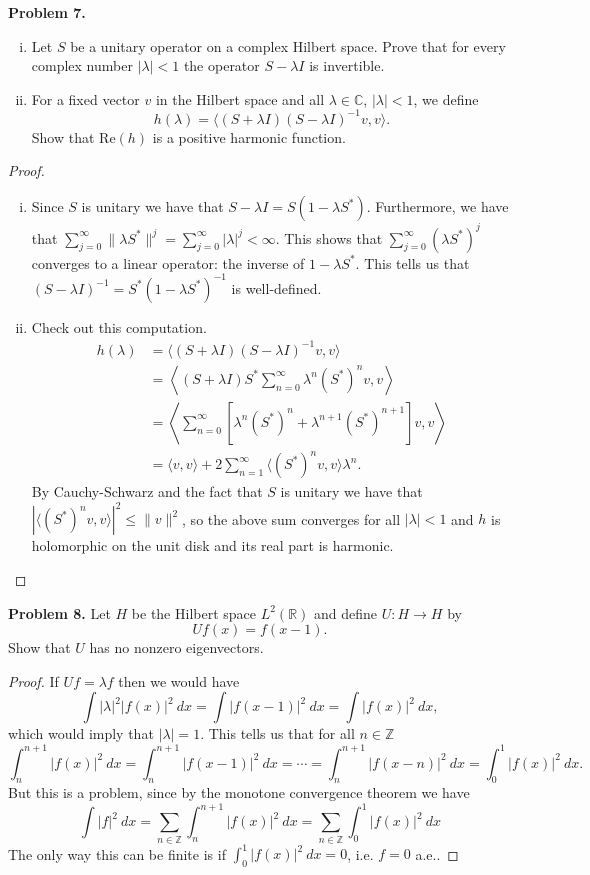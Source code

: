 \documentclass[11pt,letterpaper]{report}
\newcommand{\integers}{\mathbb{Z}}
\newcommand{\complex}{\mathbb{C}}
\newcommand{\reals}{\mathbb{R}}
\newcommand{\re}[1]{\text{Re}\left({#1}\right)}
\begin{document}
\noindent\textbf{Problem 7. }
\begin{enumerate}[(i)]
	\item Let $S$ be a unitary operator on a complex Hilbert space. Prove that for every complex number $|\lambda|<1$ the operator $S-\lambda I$ is invertible.

	\item For a fixed vector $v$ in the Hilbert space and all $\lambda \in \complex$, $|\lambda|<1$, we define
	\[
	h(\lambda) = \langle (S+\lambda I)(S-\lambda I)^{-1}v,v\rangle.
	\]
	Show that $\re h$ is a positive harmonic function.
\end{enumerate}

\begin{proof}
	\begin{enumerate}[(i)]
		\item Since $S$ is unitary we have that $S-\lambda I = S(1-\lambda S^*)$. Furthermore, we have that $\sum_{j=0}^\infty \|\lambda S^*\|^j = \sum_{j=0}^\infty |\lambda|^j<\infty$. This shows that $\sum_{j=0}^\infty (\lambda S^*)^j$ converges to a linear operator: the inverse of $1-\lambda S^*$. This tells us that $(S-\lambda I)^{-1} = S^*(1-\lambda S^*)^{-1}$ is well-defined.

		\item Check out this computation.
		\begin{align*}
			h(\lambda) &= \langle (S+\lambda I)(S-\lambda I)^{-1}v,v\rangle\\
			&= \left\langle (S+\lambda I)S^*\sum_{n=0}^\infty \lambda^n(S^*)^nv, v\right\rangle\\
			&= \left\langle\sum_{n=0}^\infty\left[\lambda^n(S^*)^n + \lambda^{n+1}(S^*)^{n+1}\right]v, v\right\rangle\\
			&= \langle v, v\rangle + 2\sum_{n=1}^\infty \langle (S^*)^nv,v\rangle\lambda^n.
		\end{align*}
		By Cauchy-Schwarz and the fact that $S$ is unitary we have that $|\langle (S^*)^nv,v\rangle|^2 \leq \|v\|^2$, so the above sum converges for all $|\lambda|<1$ and $h$ is holomorphic on the unit disk and its real part is harmonic.
	\end{enumerate}
\end{proof}

\noindent\textbf{Problem 8. }
Let $H$ be the Hilbert space $L^2(\reals)$ and define $U:H\to H$ by
\[
Uf(x) = f(x-1).
\]
Show that $U$ has no nonzero eigenvectors.
\begin{proof}
	If $Uf = \lambda f$ then we would have
	\[
	\int |\lambda|^2|f(x)|^2\ dx = \int |f(x-1)|^2\ dx = \int |f(x)|^2\ dx,
	\]
	which would imply that $|\lambda| = 1$. This tells us that for all $n\in \integers$
	\[
	\int_n^{n+1}|f(x)|^2\ dx = \int_n^{n+1}|f(x-1)|^2\ dx = \cdots = \int_n^{n+1}|f(x-n)|^2\ dx = \int_0^1|f(x)|^2\ dx.
	\]
	But this is a problem, since by the monotone convergence theorem we have
	\[
	\int |f|^2\ dx = \sum_{n\in \integers}\int_n^{n+1}|f(x)|^2\ dx = \sum_{n\in \integers}\int_0^1|f(x)|^2\ dx
	\]
	The only way this can be finite is if $\int_0^1|f(x)|^2\ dx = 0$, i.e. $f = 0$ a.e..
\end{proof}
\end{document}
